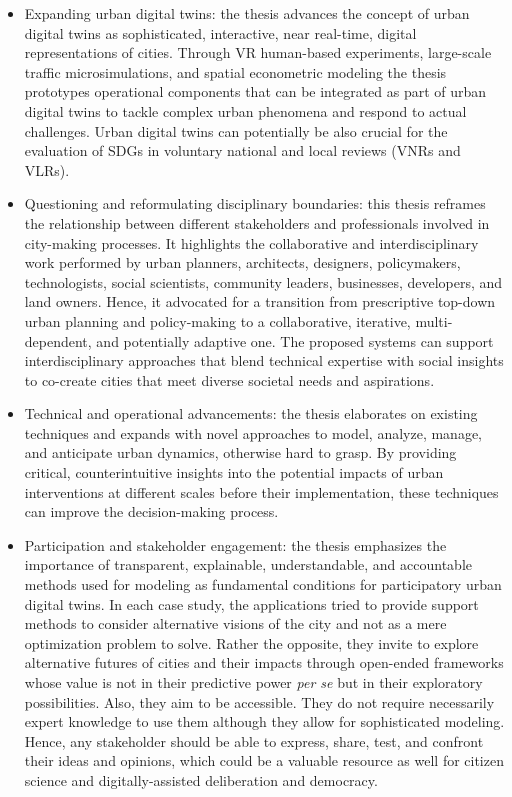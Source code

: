 \begin{itemize}
    \item Expanding urban digital twins: the thesis advances the concept of urban digital twins as sophisticated, interactive, near real-time, digital representations of cities. Through VR human-based experiments, large-scale traffic microsimulations, and spatial econometric modeling the thesis prototypes operational components that can be integrated as part of urban digital twins to tackle complex urban phenomena and respond to actual challenges. Urban digital twins can potentially be also crucial for the evaluation of SDGs in voluntary national and local reviews (VNRs and VLRs).
    \item Questioning and reformulating disciplinary boundaries: this thesis reframes the relationship between different stakeholders and professionals involved in city-making processes. It highlights the collaborative and interdisciplinary work performed by urban planners, architects, designers, policymakers, technologists, social scientists, community leaders, businesses, developers, and land owners. Hence, it advocated for a transition from prescriptive top-down urban planning and policy-making to a collaborative, iterative, multi-dependent, and potentially adaptive one. The proposed systems can support interdisciplinary approaches that blend technical expertise with social insights to co-create cities that meet diverse societal needs and aspirations.
    \item Technical and operational advancements: the thesis elaborates on existing techniques and expands with novel approaches to model, analyze, manage, and anticipate urban dynamics, otherwise hard to grasp. By providing critical, counterintuitive insights into the potential impacts of urban interventions at different scales before their implementation, these techniques can improve the decision-making process. 
    \item Participation and stakeholder engagement: the thesis emphasizes the importance of transparent, explainable, understandable, and accountable methods used for modeling as fundamental conditions for participatory urban digital twins. In each case study, the applications tried to provide support methods to consider alternative visions of the city and not as a mere optimization problem to solve. Rather the opposite, they invite to explore alternative futures of cities and their impacts through open-ended frameworks whose value is not in their predictive power \emph{per se} but in their exploratory possibilities. Also, they aim to be accessible. They do not require necessarily expert knowledge to use them although they allow for sophisticated modeling. Hence, any stakeholder should be able to express, share, test, and confront their ideas and opinions, which could be a valuable resource as well for citizen science and digitally-assisted deliberation and democracy.

\end{itemize}
